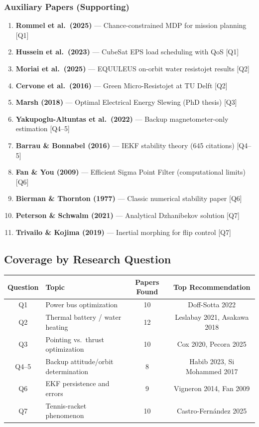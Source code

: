 \documentclass[11pt]{article}
\begin{document}
\subsubsection{Auxiliary Papers (Supporting)}
\begin{enumerate}
    \item \textbf{Rommel et al.\ (2025)} --- Chance-constrained MDP for mission planning [Q1]
    \item \textbf{Hussein et al.\ (2023)} --- CubeSat EPS load scheduling with QoS [Q1]
    \item \textbf{Moriai et al.\ (2025)} --- EQUULEUS on-orbit water resistojet results [Q2]
    \item \textbf{Cervone et al.\ (2016)} --- Green Micro-Resistojet at TU Delft [Q2]
    \item \textbf{Marsh (2018)} --- Optimal Electrical Energy Slewing (PhD thesis) [Q3]
    \item \textbf{Yakupoglu-Altuntas et al.\ (2022)} --- Backup magnetometer-only estimation [Q4--5]
    \item \textbf{Barrau \& Bonnabel (2016)} --- IEKF stability theory (645 citations) [Q4--5]
    \item \textbf{Fan \& You (2009)} --- Efficient Sigma Point Filter (computational limits) [Q6]
    \item \textbf{Bierman \& Thornton (1977)} --- Classic numerical stability paper [Q6]
    \item \textbf{Peterson \& Schwalm (2021)} --- Analytical Dzhanibekov solution [Q7]
    \item \textbf{Trivailo \& Kojima (2019)} --- Inertial morphing for flip control [Q7]
\end{enumerate}

\subsection{Coverage by Research Question}

\begin{center}
\begin{tabular}{@{}clcc@{}}
\toprule
Question & Topic & Papers Found & Top Recommendation \\
\midrule
Q1 & Power bus optimization & 10 & Doff-Sotta 2022 \\
Q2 & Thermal battery / water heating & 12 & Leslabay 2021, Asakawa 2018 \\
Q3 & Pointing vs.\ thrust optimization & 10 & Cox 2020, Pecora 2025 \\
Q4--5 & Backup attitude/orbit determination & 8 & Habib 2023, Si Mohammed 2017 \\
Q6 & EKF persistence and errors & 9 & Vigneron 2014, Fan 2009 \\
Q7 & Tennis-racket phenomenon & 10 & Castro-Fern\'{a}ndez 2025 \\
\bottomrule
\end{tabular}
\end{center}
\end{document}
